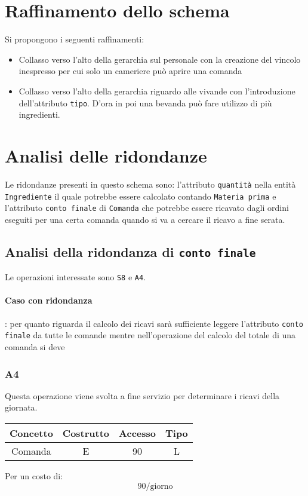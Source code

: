 \documentclass[a4paper,12pt]{report}
\begin{document}
\section{Raffinamento dello schema}
Si propongono i seguenti raffinamenti:
\begin{itemize}
    \item Collasso verso l'alto della gerarchia sul personale con la creazione del vincolo inespresso per cui solo un cameriere può aprire una comanda
    \item Collasso verso l'alto della gerarchia riguardo alle vivande con l'introduzione dell'attributo \texttt{tipo}. D'ora in poi una bevanda può fare utilizzo di più ingredienti.
\end{itemize}
\section{Analisi delle ridondanze}\label{sec:redun}
Le ridondanze presenti in questo schema sono: l'attributo \texttt{quantità} nella entità \texttt{Ingrediente} il quale potrebbe essere calcolato contando \texttt{Materia prima} e l'attributo \texttt{conto finale} di \texttt{Comanda} che potrebbe essere ricavato dagli ordini eseguiti per una certa comanda quando si va a cercare il ricavo a fine serata. 
\subsection{Analisi della ridondanza di \texttt{conto finale}}
%
Le operazioni interessate sono \texttt{S8} e \texttt{A4}.
%
\paragraph{Caso con ridondanza}: per quanto riguarda il calcolo dei ricavi sarà sufficiente leggere l'attributo \texttt{conto finale} da tutte le comande mentre nell'operazione del calcolo del totale di una comanda si deve
%
\subsubsection{A4}
Questa operazione viene svolta a fine servizio per determinare i ricavi della giornata.
%
\begin{table}[H]
    \centering
    \begin{tabular}{|| c | c | c | c ||}
        \hline
        Concetto & Costrutto & Accesso & Tipo\\
        \hline
        Comanda & E & 90 & L\\
        \hline
    \end{tabular}
\end{table}
%
Per un costo di:
\begin{equation}
    90\text{/giorno}
\end{equation}
%
\end{document}
